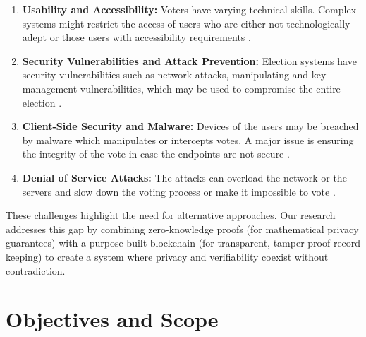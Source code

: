 \documentclass[12pt, a4paper]{report}
\begin{document}
\begin{enumerate}
    \item \textbf{Usability and Accessibility:} Voters have varying technical skills. Complex systems might restrict the access of users who are either not technologically adept or those users with accessibility requirements \cite{hajian2024blockchain}\cite{vladucu2023evoting}.
    
    \item \textbf{Security Vulnerabilities and Attack Prevention:} Election systems have security vulnerabilities such as network attacks, manipulating and key management vulnerabilities, which may be used to compromise the entire election \cite{hajian2024blockchain}\cite{vladucu2023evoting}.

    \item \textbf{Client-Side Security and Malware:} Devices of the users may be breached by malware which manipulates or intercepts votes. A major issue is ensuring the integrity of the vote in case the endpoints are not secure \cite{jetir2025secureblockchain}\cite{ivoting-ccs2014}\cite{halderman2015ivote}.
    
    \item \textbf{Denial of Service Attacks:} The attacks can overload the network or the servers and slow down the voting process or make it impossible to vote \cite{jetir2025secureblockchain}\cite{prajapat2020investigating}.
\end{enumerate}

These challenges highlight the need for alternative approaches. Our research addresses this gap by combining zero-knowledge proofs (for mathematical privacy guarantees) with a purpose-built blockchain (for transparent, tamper-proof record keeping) to create a system where privacy and verifiability coexist without contradiction.
\newpage
\section{Objectives and Scope}
\end{document}
